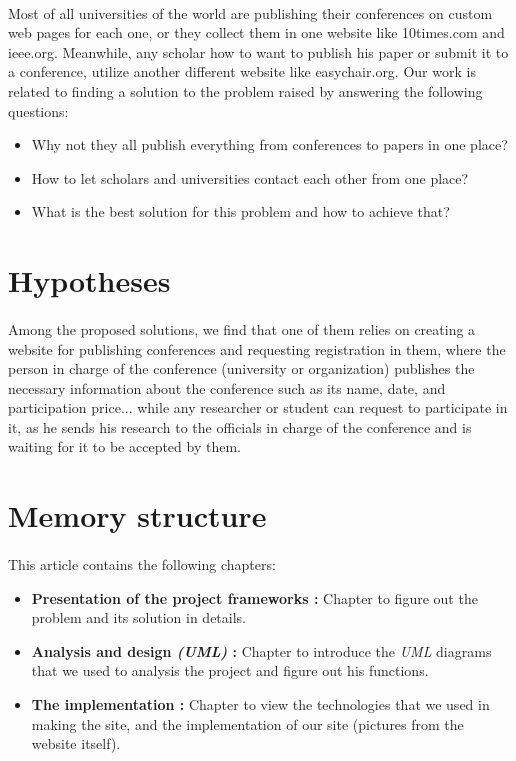 	\paragraph{}
	Most of all universities of the world are publishing their conferences on custom web pages for each one, or they collect them in one website like 10times.com and ieee.org. Meanwhile, any scholar how to want to publish his paper or submit it to a conference, utilize another different website like easychair.org. Our work is related to finding a solution to the problem raised by answering the following questions:
	\begin{itemize}
		\item Why not they all publish everything from conferences to papers in one place?
		\item How to let scholars and universities contact each other from one place?
		\item What is the best solution for this problem and how to achieve that?
	\end{itemize}

\section{Hypotheses}
	\paragraph{}
	Among the proposed solutions, we find that one of them relies on creating a website for publishing conferences and requesting registration in them, where the person in charge of the conference (university or organization) publishes the necessary information about the conference such as its name, date, and participation price... while any researcher or student can request to participate in it, as he sends his research to the officials in charge of the conference and is waiting for it to be accepted by them.
	
\section{Memory structure}
	\paragraph{}
	This article contains the following chapters:
	\begin{itemize}
	
		\item \textbf{Presentation of the project frameworks :}
		Chapter to figure out the problem and its solution in details.
		
		\item \textbf{Analysis and design \textit{(UML)} :}
		Chapter to introduce the \textit{UML} diagrams that we used to analysis the project and figure out his functions.
		
		\item \textbf{The implementation :}
		Chapter to view the technologies that we used in making the site, and the implementation of our site (pictures from the website itself).
	
	\end{itemize}